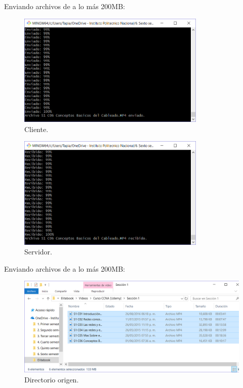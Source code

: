 \documentclass[12pt,twoside]{article}
\begin{document}
\newpage

Enviando archivos de a lo m\'as 200MB:
\begin{figure}[h]
	\centering
	\includegraphics[width=0.8\textwidth]{img/Cliente2.png}
	\caption{Cliente.}
\end{figure}

\begin{figure}[h]
	\centering
	\includegraphics[width=0.8\textwidth]{img/Servidor2.png}
	\caption{Servidor.}
\end{figure}

\newpage

Enviando archivos de a lo m\'as 200MB:
\begin{figure}[h]
	\centering
	\includegraphics[width=1\textwidth]{img/ArchivosEnviados.png}
	\caption{Directorio origen.}
\end{figure}
\end{document}
